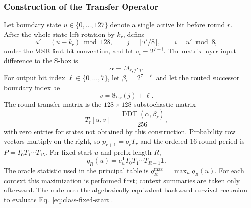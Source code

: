 \documentclass[cryptography,article,submit,oneauthor]{Definitions/mdpi}
\begin{document}
\subsubsection{Construction of the Transfer Operator}\label{sec:transfer-spec}
Let boundary state $u\in\{0,\ldots,127\}$ denote a single active bit before round $r$. After the whole-state left rotation by $k_r$, define
\[
 u'=(u-k_r)\bmod128,\qquad j=\lfloor u'/8\rfloor,\qquad i=u'\bmod8,
\]
under the MSB-first bit convention, and let $e_i=2^{7-i}$. The matrix-layer input difference to the S-box is
\[
 \alpha=M_{r,j}e_i.
\]
For output bit index $\ell\in\{0,\ldots,7\}$, let $\beta_\ell=2^{7-\ell}$ and let the routed successor boundary index be
\[
 v=8\pi_r(j)+\ell.
\]
The round transfer matrix is the $128\times128$ substochastic matrix
\begin{equation}
 T_r[u,v]=\frac{\operatorname{DDT}(\alpha,\beta_\ell)}{256},
 \label{eq:transfer-entry}
\end{equation}
with zero entries for states not obtained by this construction. Probability row vectors multiply on the right, so $p_{r+1}=p_rT_r$ and the ordered 16-round period is $P=T_0T_1\cdots T_{15}$. For fixed start $u$ and prefix length $R$,
\begin{equation}
 q_R(u)=e_u^{\mathsf T}T_0T_1\cdots T_{R-1}\mathbf 1.
 \label{eq:class-fixed-start}
\end{equation}
The oracle statistic used in the principal table is $q_R^{\max}=\max_u q_R(u)$. For each context this maximization is performed first; context summaries are taken only afterward. The code uses the algebraically equivalent backward survival recursion to evaluate Eq.~\eqref{eq:class-fixed-start}.
\end{document}
